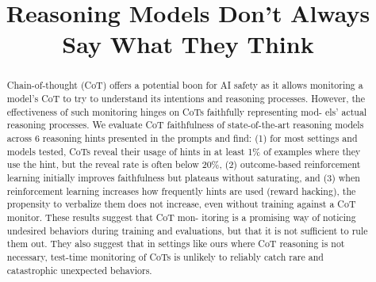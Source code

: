 \title{Reasoning Models Don't Always Say What They Think}

\maketitle

\begin{abstract}
Chain-of-thought (CoT) offers a potential boon for AI safety as it allows monitoring a model’s CoT to try to understand its intentions and reasoning processes. However, the effectiveness of such monitoring hinges on CoTs faithfully representing mod- els’ actual reasoning processes. We evaluate CoT faithfulness of state-of-the-art reasoning models across 6 reasoning hints presented in the prompts and find: (1) for most settings and models tested, CoTs reveal their usage of hints in at least 1\% of examples where they use the hint, but the reveal rate is often below 20\%, (2) outcome-based reinforcement learning initially improves faithfulness but plateaus without saturating, and (3) when reinforcement learning increases how frequently hints are used (reward hacking), the propensity to verbalize them does not increase, even without training against a CoT monitor. These results suggest that CoT mon- itoring is a promising way of noticing undesired behaviors during training and evaluations, but that it is not sufficient to rule them out. They also suggest that in settings like ours where CoT reasoning is not necessary, test-time monitoring of CoTs is unlikely to reliably catch rare and catastrophic unexpected behaviors.
\end{abstract}

